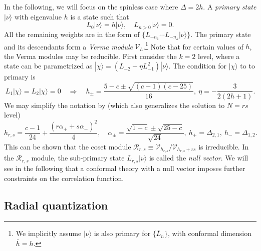 \documentclass[aps,prb,superscriptaddress,nofootinbib]{revtex4}
\begin{document}
In the following, we will focus on the spinless case where $\Delta = 2h$.
A \textit{primary state} $|\nu\rangle$ with eigenvalue $h$ is a state such that 
\begin{equation}
	L_0|\nu\rangle = h|\nu\rangle,\quad
	L_{n>0} |\nu\rangle = 0.
\end{equation}
All the remaining weights are in the form of $\{L_{-n_1}\cdots L_{-n_k}|\nu\rangle\}$.
The primary state and its descendants form a \textit{Verma module} $\mathscr V_h$.\footnote{We implicitly assume $|\nu\rangle$ is also primary for $\{\bar L_n\}$, with conformal dimension $\bar h=h$.}
Note that for certain values of $h$, the Verma modules may be reducible.
First consider the $k=2$ level, where a state can be parametrized as $|\chi\rangle = (L_{-2} + \eta L_{-1}^2)|\nu\rangle$.
The condition for $|\chi\rangle$ to to primary is
\begin{equation}
	L_1|\chi\rangle = L_2|\chi\rangle = 0 
	\quad \Longrightarrow \quad 
	h_\pm = \frac{5-c\pm\sqrt{(c-1)(c-25)}}{16},\ 
	\eta=-\frac{3}{2(2h+1)}.
\end{equation}
We may simplify the notation by (which also generalizes the solution to $N=rs$ level)
\begin{equation}
	h_{r,s} = \frac{c-1}{24} + \frac{(r\alpha_+ + s \alpha_-)^2}{4}, \quad
	\alpha_\pm = \frac{\sqrt{1-c}\pm\sqrt{25-c}}{\sqrt{24}},\ 
	h_+ =\Delta_{2,1},\ h_-=\Delta_{1,2}.
\end{equation}
This can be shown that the coset module $\mathscr R_{r,s} \equiv \mathscr V_{h_{r,s}}/\mathscr V_{h_{r,s}+rs}$ is irreducible.
In the $\mathscr R_{r,s}$ module, the sub-primary state $L_{r,s}|\nu\rangle$ is called the \textit{null vector}.
We will see in the following that a conformal theory with a null vector imposes further constraints on the correlation function.

\subsection{Radial quantization}
\end{document}
